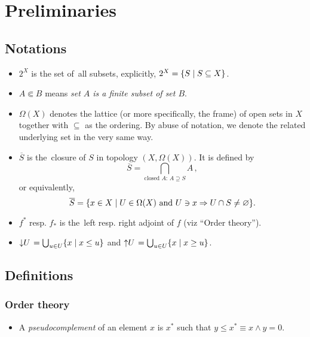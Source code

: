 \chapter{Preliminaries}

\section*{Notations}

\begin{itemize}
\item $2^X$ is the set of~all subsets, explicitly, $2^X = \{ S \mid S\subseteq X
\}$.

\item $A \Subset B$ means {\sl set $A$ is a finite subset of set $B$\/}.

\item $\Omega(X)$ denotes the lattice (or more specifically, the frame) of open
sets in $X$ together with $\subseteq$ as the ordering. 
By abuse of notation, we denote the related underlying set in the very same
way.

\item $\overline{S}$ is the~closure of $S$ in topology $(X, \Omega(X))$.
It is defined by
\[
  \overline{S} = \bigcap_{ \text{closed } A\colon \, A\supseteq S} A
  \, ,
\]
or equivalently,
\[
  \overline{S} = \{ x \in X \mid U\in\Omega(X) \text{ and } U\owns x \Rightarrow
  U \cap S \ne \varnothing \}.
\]
\item $f^*$ resp. $f_*$ is the~left resp. right adjoint of $f$ (viz ``Order
theory'').
\item $\left\downarrow U \right. = \bigcup_{u\in U} \{x \mid x \le u\}$ and
$\left\uparrow U \right. = \bigcup_{u\in U} \{x \mid x \ge u\}$.

\end{itemize}

\section*{Definitions}

\subsection*{Order theory}

\begin{itemize}
\item A \emph{pseudocomplement} of an element $x$ is $x^*$ such that $y \le x^*
\equiv x \wedge y = 0$.
\end{itemize}

